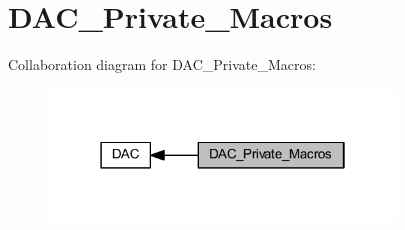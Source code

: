 \hypertarget{group___d_a_c___private___macros}{}\section{D\+A\+C\+\_\+\+Private\+\_\+\+Macros}
\label{group___d_a_c___private___macros}
Collaboration diagram for D\+A\+C\+\_\+\+Private\+\_\+\+Macros\+:
\nopagebreak
\begin{figure}[H]
\begin{center}
\leavevmode
\includegraphics[width=262pt]{group___d_a_c___private___macros}
\end{center}
\end{figure}
